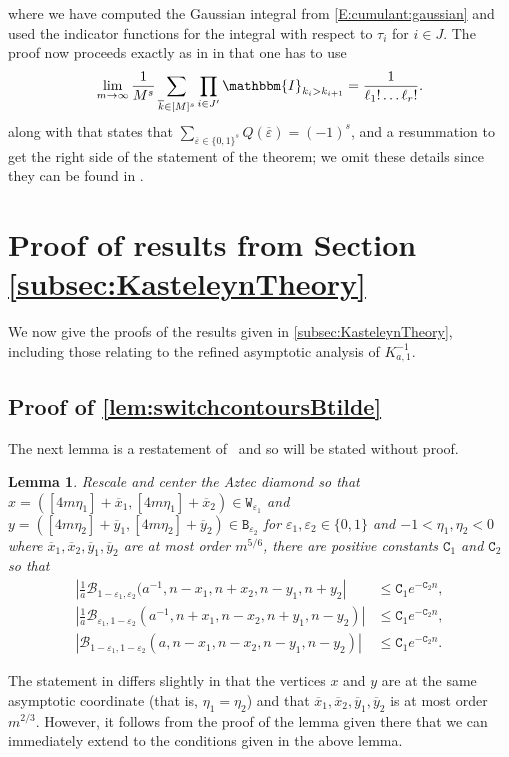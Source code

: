 \documentclass[11pt,twoside]{amsart}
\theoremstyle{plain}
\newtheorem{lem}[thm]{Lemma}
\numberwithin{quest}{section}
\theoremstyle{remark}
\numberwithin{rem}{section}
\theoremstyle{definition}
\newcommand{\eps}{\varepsilon}
\begin{document}
where we have computed the Gaussian integral from \eqref{E:cumulant:gaussian} and used the indicator functions for the integral with respect to $\tau_i$ for $i\in J$.  
The proof now proceeds exactly as in \cite{BCJ18} in that one has to use 
$$\lim_{m \to \infty} \frac{1}{M^s}\sum_{\overline{k}\in [M]^s}\prod_{i \in J'} \mathbbm{I}_{k_i>k_{i+1}}= \frac{1}{\ell_1! \dots \ell_r!}.$$
along with \cite[Lemma 4.6]{BCJ18} that states that $\sum_{\overline{\eps} \in \{0,1\}^s}Q(\overline{\eps})=(-1)^s$, and a resummation to get the right side of the statement of the theorem; we omit these details since they can be found in \cite{BCJ18}. 
		
	
		
	
	\section{Proof of results from Section \ref{subsec:KasteleynTheory}} \label{subsec:Kinvasympproofs}
	
	We now give the proofs of the results given in \cref{subsec:KasteleynTheory}, including those relating to the refined asymptotic analysis of $K^{-1}_{a,1}$.  
	
	\subsection{Proof of \cref{lem:switchcontoursBtilde}}
	The next lemma is a restatement of~\cite[Lemma 3.6]{CJ16} and so will be stated without proof. 
	\begin{lem}\label{lem:prev:termsdecay}
		Rescale and center the Aztec diamond so that $x=([4m\eta_1]+\overline{x}_1,[4m\eta_1]+\overline{x}_2) \in \mathtt{W}_{\eps_1}$ and $y=([4m\eta_2]+\overline{y}_1,[4m\eta_2]+\overline{y}_2) \in \mathtt{B}_{\eps_2}$ for $\eps_1,\eps_2\in \{0,1\}$ and $-1<\eta_1,\eta_2<0$ where $\overline{x}_1,\overline{x}_2,\overline{y}_1,\overline{y}_2$ are at most order $m^{5/6}$, there are  positive constants $\mathtt{C}_1$ and $\mathtt{C}_2$ so that
        \begin{align*}
			\left|\frac{1}{a}\mathcal{B}_{1-\eps_1,\eps_2}(a^{-1},n-x_1,n+x_2,n-y_1,n+y_2 \right|&\leq  \mathtt{C}_1 e^{-\mathtt{C}_2 n}, \\
			\left|\frac{1}{a}\mathcal{B}_{\eps_1,1-\eps_2}(a^{-1},n+x_1,n-x_2,n+y_1,n-y_2) \right| &\leq  \mathtt{C}_1 e^{-\mathtt{C}_2 n},\\
			\left|\mathcal{B}_{1-\eps_1,1-\eps_2}(a,n-x_1,n-x_2,n-y_1,n-y_2) \right| &\leq  \mathtt{C}_1 e^{-\mathtt{C}_2 n}.
        \end{align*}
		
	\end{lem}
	The statement in \cite[Lemma 3.6]{CJ16} differs slightly in that the vertices $x$ and $y$ are at the same asymptotic  coordinate (that is, $\eta_1=\eta_2$) and that 
	$\overline{x}_1,\overline{x}_2, \overline{y}_1,\overline{y}_2$ is at most order $m^{2/3}$. However, it follows from the proof of the lemma given there that we can immediately extend to the conditions given in the above lemma. 
	
\end{document}
